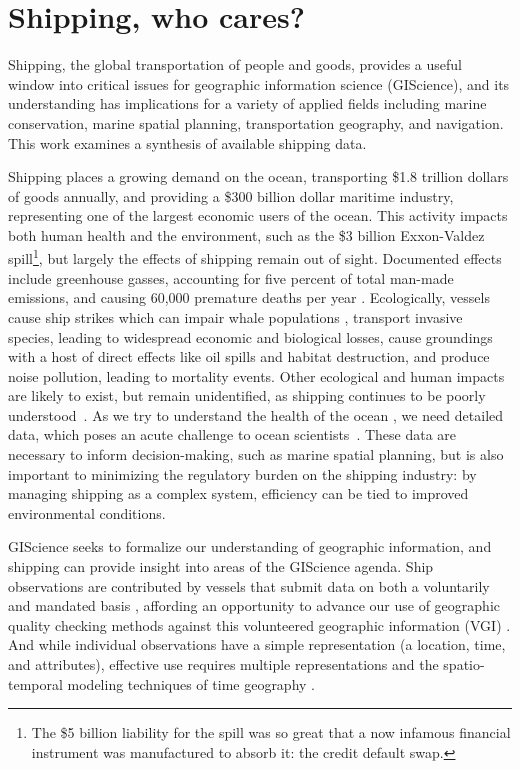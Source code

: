 \section{Shipping, who cares?}
Shipping, the global transportation of people and goods, provides a useful window into critical issues for geographic information science (GIScience), and its understanding has implications for a variety of applied fields including marine conservation, marine spatial planning, transportation geography, and navigation.  This work examines a synthesis of available shipping data.

Shipping places a growing demand on the ocean, transporting \$1.8 trillion dollars of goods annually, %
and providing a \$300 billion dollar maritime industry, representing one of the largest economic users of the ocean. This activity impacts both human health and the environment, such as the \$3 billion Exxon-Valdez spill\footnote{The \$5 billion liability for the spill was so great that a now infamous financial instrument was manufactured to absorb it: the credit default swap.}, but largely the effects of shipping remain out of sight. Documented effects include greenhouse gasses, accounting for five percent of total man-made emissions, and causing 60,000 premature deaths per year \citep{Corbett2007}. Ecologically, vessels cause ship strikes which can impair whale populations \citep{Fujiwara2001}, %
 transport invasive species, leading to widespread economic and biological losses, cause groundings with a host of direct effects like oil spills and habitat destruction, and produce noise pollution, leading to mortality events. Other ecological and human impacts are likely to exist, but remain unidentified, as shipping continues to be poorly understood~\citep{Davenport2006}. As we try to understand the health of the ocean \citep{Halpern2012}, we need detailed data, which poses an acute challenge to ocean scientists~\citep{Wright1997}. These data are necessary to inform decision-making, such as marine spatial planning, but is also important to minimizing the regulatory burden on the shipping industry: by managing shipping as a complex system, efficiency can be tied to improved environmental conditions.

GIScience seeks to formalize our understanding of geographic information, and shipping can provide insight into areas of the GIScience agenda. Ship observations are contributed by vessels that submit data on both a voluntarily and mandated basis \citep{VOSClim,Tetreault2002}, affording an opportunity to advance our use of geographic quality checking methods \citep{goodchildli2012} against this volunteered geographic information (VGI) \citep{goodchild2007citizens}. And while individual observations have a simple representation (a location, time, and attributes), effective use requires multiple representations \citep{Goodchild1992} and the spatio-temporal modeling techniques of time geography \citep{miller2008field}.

